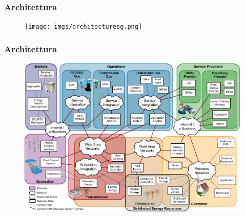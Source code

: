 
\begin{frame}[fragile]
  \frametitle{Architettura}
	\begin{figure}[h] 
		\texttt{[image: imgs/architecturesg.png]}
	\end{figure}
\end{frame}

\begin{frame}[fragile]
  \frametitle{Architettura}
	\begin{figure}[h] 
		\includegraphics[scale=0.4]{imgs/arch.png}
	\end{figure}
\end{frame}